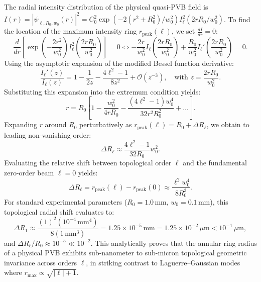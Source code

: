 \documentclass{optica-article}
\begin{document}
The radial intensity distribution of the physical quasi-PVB field is $I(r) = |\psi_{\ell, R_0, w_0}(r)|^2 = C_0^2 \exp(-2(r^2 + R_0^2)/w_0^2) I_\ell^2(2 r R_0 / w_0^2)$.
To find the location of the maximum intensity ring $r_{\text{peak}}(\ell)$, we set $\frac{d I}{dr} = 0$:
\begin{equation}
\frac{d}{dr} \left[ \exp\left(-\frac{2 r^2}{w_0^2}\right) I_\ell^2\left(\frac{2 r R_0}{w_0^2}\right) \right] = 0 \iff -\frac{2r}{w_0^2} I_\ell\left(\frac{2 r R_0}{w_0^2}\right) + \frac{R_0}{w_0^2} I_\ell'\left(\frac{2 r R_0}{w_0^2}\right) = 0.
\label{eq:app_peak_derivative}
\end{equation}
Using the asymptotic expansion of the modified Bessel function derivative:
\begin{equation}
\frac{I_\ell'(z)}{I_\ell(z)} = 1 - \frac{1}{2z} - \frac{4\ell^2 - 1}{8 z^2} + \mathcal{O}(z^{-3}), \quad \text{with } z = \frac{2 r R_0}{w_0^2}.
\label{eq:app_ratio_bessel_deriv}
\end{equation}
Substituting this expansion into the extremum condition yields:
\begin{equation}
r = R_0 \left[ 1 - \frac{w_0^2}{4 r R_0} - \frac{(4\ell^2 - 1) w_0^4}{32 r^2 R_0^2} + \dots \right].
\label{eq:app_r_expansion}
\end{equation}
Expanding $r$ around $R_0$ perturbatively as $r_{\text{peak}}(\ell) = R_0 + \Delta R_\ell$, we obtain to leading non-vanishing order:
\begin{equation}
\Delta R_\ell \approx \frac{4\ell^2 - 1}{32 R_0} w_0^2.
\label{eq:app_delta_r_ell}
\end{equation}
Evaluating the relative shift between topological order $\ell$ and the fundamental zero-order beam $\ell = 0$ yields:
\begin{equation}
\boxed{\Delta R_\ell = r_{\text{peak}}(\ell) - r_{\text{peak}}(0) \approx \frac{\ell^2 w_0^4}{8 R_0^3}.}
\label{eq:app_delta_r_final}
\end{equation}
For standard experimental parameters ($R_0 = 1.0\,\text{mm}$, $w_0 = 0.1\,\text{mm}$), this topological radial shift evaluates to:
\begin{equation}
\Delta R_1 \approx \frac{(1)^2 (10^{-4}\,\text{mm}^4)}{8 (1\,\text{mm}^3)} = 1.25 \times 10^{-5}\,\text{mm} = 1.25 \times 10^{-2}\,\mu\text{m} < 10^{-1}\,\mu\text{m},
\label{eq:app_shift_eval}
\end{equation}
and $\Delta R_\ell / R_0 \approx 10^{-5} \ll 10^{-2}$.
This analytically proves that the annular ring radius of a physical PVB exhibits sub-nanometer to sub-micron topological geometric invariance across orders $\ell$, in striking contrast to Laguerre--Gaussian modes where $r_{\max} \propto \sqrt{|\ell|+1}$.
\end{document}
